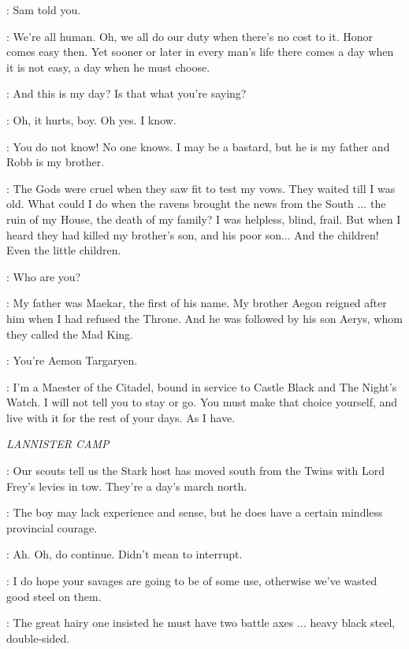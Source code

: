\JON: Sam told you. 

\AEMON: We're all human. Oh, we all do our duty when there's no cost to it. Honor comes easy then. Yet sooner or later in every man's life there comes a day when it is not easy, a day when he must choose. 

\JON: And this is my day? Is that what you're saying? 

\AEMON: Oh, it hurts, boy. Oh yes. I know. 

\JON: You do not know! No one knows.  I may be a bastard, but he is my father and Robb is my brother. 

\AEMON: The Gods were cruel when they saw fit to test my vows. They waited till I was old. What could I do when the ravens brought the news from the South $\ldots$ the ruin of my House, the death of my family? I was helpless, blind, frail. But when I heard they had killed my brother's son, and his poor son$\ldots$ And the children! Even the little children. 

\JON: Who are you? 

\AEMON: My father was Maekar, the first of his name. My brother Aegon reigned after him when I had refused the Throne. And he was followed by his son Aerys, whom they called the Mad King. 

\JON: You're Aemon Targaryen. 

\AEMON: I'm a Maester of the Citadel, bound in service to Castle Black and The Night's Watch. I will not tell you to stay or go. You must make that choice yourself, and live with it for the rest of your days. As I have. 



\scene

\textit{LANNISTER CAMP} 


\KEVAN: Our scouts tell us the Stark host has moved south from the Twins with Lord Frey's levies in tow. They're a day's march north. 

\TYWIN: The boy may lack experience and sense, but he does have a certain mindless provincial courage. 

\TYRION: Ah. Oh, do continue. Didn't mean to interrupt. 

\TYWIN: I do hope your savages are going to be of some use, otherwise we've wasted good steel on them. 

\KEVAN: The great hairy one insisted he must have two battle axes $\ldots$ heavy black steel, double-sided. 

